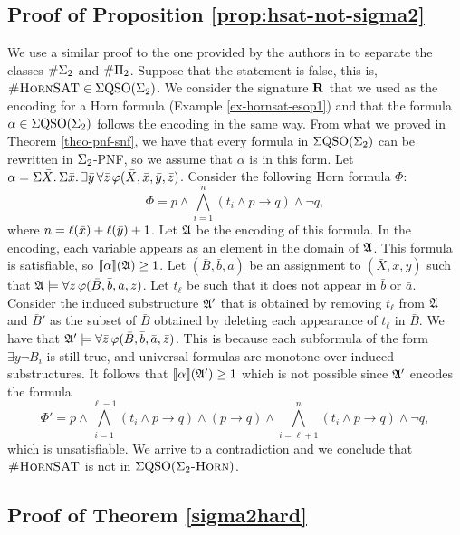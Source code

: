 \subsection*{Proof of Proposition \ref{prop:hsat-not-sigma2}} %
We use a similar proof to the one provided by the authors in \cite{SalujaST95} to separate the classes $\#\Sigma_{2}$ and $\#\Pi_{2}$. Suppose that the statement is false, this is, $\textsc{\#HornSAT} \in \Sigma{\rm QSO}(\Sigma_{2})$. We consider the signature $\mathbf{R}$ that we used as the encoding for a Horn formula (Example \ref{ex-hornsat-esop1}) and that the formula $\alpha \in \Sigma{\rm QSO}(\Sigma_{2})$ follows the encoding in the same way. From what we proved in Theorem \ref{theo-pnf-snf}, we have that every formula in $\Sigma{\rm QSO}(\Sigma_{2})$ can be rewritten in $\Sigma_{2}$-PNF, so we assume that $\alpha$ is in this form. Let $\alpha = \Sigma{\bar{X}}.\,\Sigma{\bar{x}}.\,\exists\bar{y}\,\forall\bar{z}\,\varphi(\bar{X},\bar{x},\bar{y},\bar{z})$. Consider the following Horn formula $\Phi$:
$$
\Phi = p \wedge \bigwedge_{i = 1}^n (t_i \wedge p \to q) \wedge \neg q,
$$
where $n = \ell(\bar{x}) + \ell(\bar{y}) + 1$. Let $\mathfrak{A}$ be the encoding of this formula. In the encoding, each variable appears as an element in the domain of $\mathfrak{A}$. This formula is satisfiable, so ${\llbracket{}{\alpha}\rrbracket}(\mathfrak{A}) \geq 1$. Let $(\bar{B},\bar{b},\bar{a})$ be an assignment to $(\bar{X},\bar{x},\bar{y})$ such that $\mathfrak{A}\models\forall\bar{z}\,\varphi(\bar{B},\bar{b},\bar{a},\bar{z})$. Let $t_{\ell}$ be such that it does not appear in $\bar{b}$ or $\bar{a}$. Consider the induced substructure $\mathfrak{A}'$ that is obtained by removing $t_{\ell}$ from $\mathfrak{A}$ and $\bar{B}'$ as the subset of $\bar{B}$ obtained by deleting each appearance of $t_{\ell}$ in $\bar{B}$. We have that $\mathfrak{A}'\models\forall\bar{z}\,\varphi(\bar{B},\bar{b},\bar{a},\bar{z})$. This is because each subformula of the form $\exists y \neg B_i$ is still true, and universal formulas are monotone over induced substructures. It follows that ${\llbracket{}{\alpha}\rrbracket}(\mathfrak{A}') \geq 1$ which is not possible since $\mathfrak{A}'$ encodes the formula
$$
\Phi' = p \wedge \bigwedge_{i = 1}^{\ell-1} (t_i \wedge p \to q) \wedge (p\to q) \wedge \bigwedge_{i = \ell+1}^{n} (t_i \wedge p \to q) \wedge \neg q,
$$
which is unsatisfiable. We arrive to a contradiction and we conclude that $\textsc{\#HornSAT}$ is not in $\Sigma{\rm QSO}(\Sigma_2\textsc{-Horn})$.








\subsection*{Proof of Theorem \ref{sigma2hard}} %

